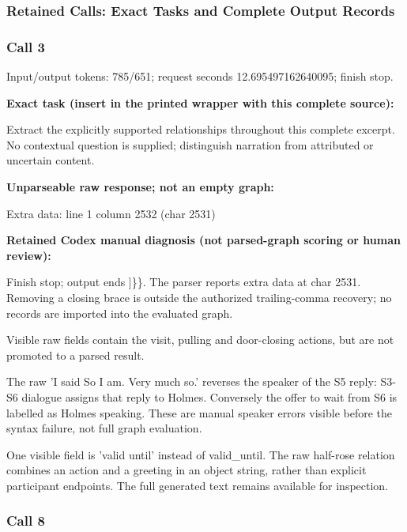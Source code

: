 \subsubsection*{Retained Calls: Exact Tasks and Complete Output Records}

\subsubsection*{Call 3}

Input/output tokens: 785/651; request seconds 12.695497162640095; finish stop.

\noindent\textbf{Exact task (insert in the printed wrapper with this complete source):}\par Extract the explicitly supported relationships throughout this complete excerpt. No contextual question is supplied; distinguish narration from attributed or uncertain content.

\noindent\textbf{Unparseable raw response; not an empty graph:}


Extra data: line 1 column 2532 (char 2531)

\noindent\textbf{Retained Codex manual diagnosis (not parsed-graph scoring or human review):}

Finish stop; output ends ]\}\}. The parser reports extra data at char 2531. Removing a closing brace is outside the authorized trailing-comma recovery; no records are imported into the evaluated graph.

Visible raw fields contain the visit, pulling and door-closing actions, but are not promoted to a parsed result.\par

The raw 'I said So I am. Very much so.' reverses the speaker of the S5 reply: S3-S6 dialogue assigns that reply to Holmes. Conversely the offer to wait from S6 is labelled as Holmes speaking. These are manual speaker errors visible before the syntax failure, not full graph evaluation.\par

One visible field is 'valid until' instead of valid\_until. The raw half-rose relation combines an action and a greeting in an object string, rather than explicit participant endpoints. The full generated text remains available for inspection.\par

\subsubsection*{Call 8}

